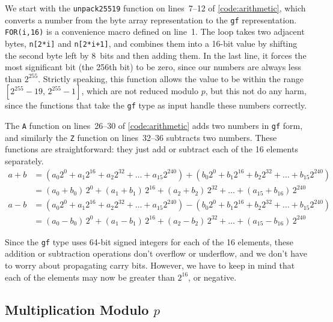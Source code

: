 \documentclass{article}
\begin{document}
We start with the \verb|unpack25519| function on lines~7--12 of \autoref{code:arithmetic}, which converts a number from the byte array representation to the \verb|gf| representation.
\verb|FOR(i,16)| is a convenience macro defined on line~1.
The loop takes two adjacent bytes, \verb|n[2*i]| and \verb|n[2*i+1]|, and combines them into a 16-bit value by shifting the second byte left by 8~bits and then adding them.
In the last line, it forces the most significant bit (the 256th bit) to be zero, since our numbers are always less than $2^{255}$.
Strictly speaking, this function allows the value to be within the range $[2^{255} - 19,\, 2^{255} - 1]$, which are not reduced modulo $p$, but this not do any harm, since the functions that take the \verb|gf| type as input handle these numbers correctly.

The \verb|A| function on lines~26--30 of \autoref{code:arithmetic} adds two numbers in \verb|gf| form, and similarly the \verb|Z| function on lines~32--36 subtracts two numbers.
These functions are straightforward: they just add or subtract each of the 16 elements separately.
\begin{align*}
    a + b &= (a_0 2^0 + a_1 2^{16} + a_2 2^{32} + \dots + a_{15} 2^{240}) + (b_0 2^0 + b_1 2^{16} + b_2 2^{32} + \dots + b_{15} 2^{240}) \\
    &= (a_0 + b_0)\, 2^0 + (a_1 + b_1)\, 2^{16} + (a_2 + b_2)\, 2^{32} + \dots + (a_{15} + b_{16})\, 2^{240} \\[6pt]
    a - b &= (a_0 2^0 + a_1 2^{16} + a_2 2^{32} + \dots + a_{15} 2^{240}) - (b_0 2^0 + b_1 2^{16} + b_2 2^{32} + \dots + b_{15} 2^{240}) \\
    &= (a_0 - b_0)\, 2^0 + (a_1 - b_1)\, 2^{16} + (a_2 - b_2)\, 2^{32} + \dots + (a_{15} - b_{16})\, 2^{240}
\end{align*}

Since the \verb|gf| type uses 64-bit signed integers for each of the 16 elements, these addition or subtraction operations don't overflow or underflow, and we don't have to worry about propagating carry bits.
However, we have to keep in mind that each of the elements may now be greater than $2^{16}$, or negative.

\subsection{Multiplication Modulo $p$}\label{sec:multiplication}
\end{document}

